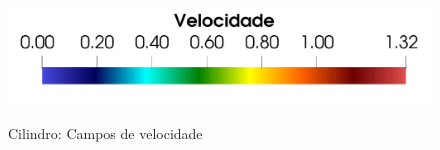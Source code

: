 \documentclass[tese_patricia]{subfiles}%
\begin{document}
\begin{figure}[htb!]
	{\includegraphics[trim=0cm 0cm 0cm 0cm,clip=true,scale=0.3]{Imagens/Cap2/cilindro_legendaVel.pdf}} \\
	\caption{Cilindro: Campos de velocidade}
	\label{fig:cilindro_camposVel}
\end{figure}

\begin{figure}[htb!]
	\centering
	 \
	 \\

\end{figure}
\end{document}
